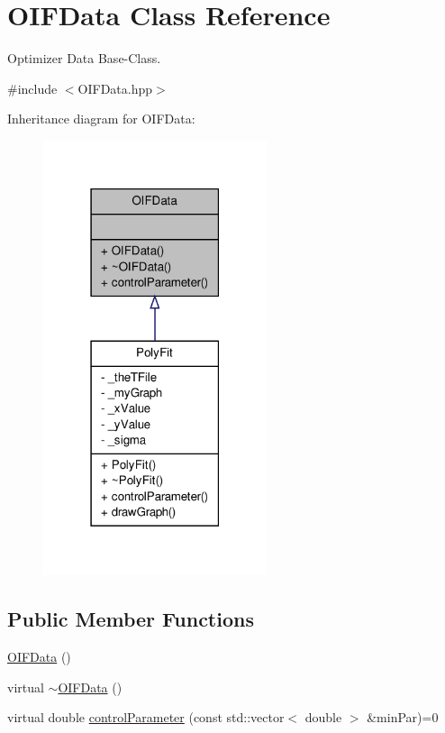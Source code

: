 \hypertarget{classOIFData}{
\section{OIFData Class Reference}
\label{d1/d4f/classOIFData}
}


Optimizer Data Base-\/Class.  




{\ttfamily \#include $<$OIFData.hpp$>$}



Inheritance diagram for OIFData:
\nopagebreak
\begin{figure}[H]
\begin{center}
\leavevmode
\includegraphics[width=186pt]{d9/d48/classOIFData__inherit__graph}
\end{center}
\end{figure}
\subsection*{Public Member Functions}
\begin{DoxyCompactItemize}
\item 
\hyperlink{classOIFData_a11151212f0897c14c0b81b0b55939473}{OIFData} ()
\item 
virtual \hyperlink{classOIFData_ab7126c43d4911e022db3033996fc345c}{$\sim$OIFData} ()
\item 
virtual double \hyperlink{classOIFData_adb5b2e9a28b1767f07ccb8737211ff4f}{controlParameter} (const std::vector$<$ double $>$ \&minPar)=0
\end{DoxyCompactItemize}


